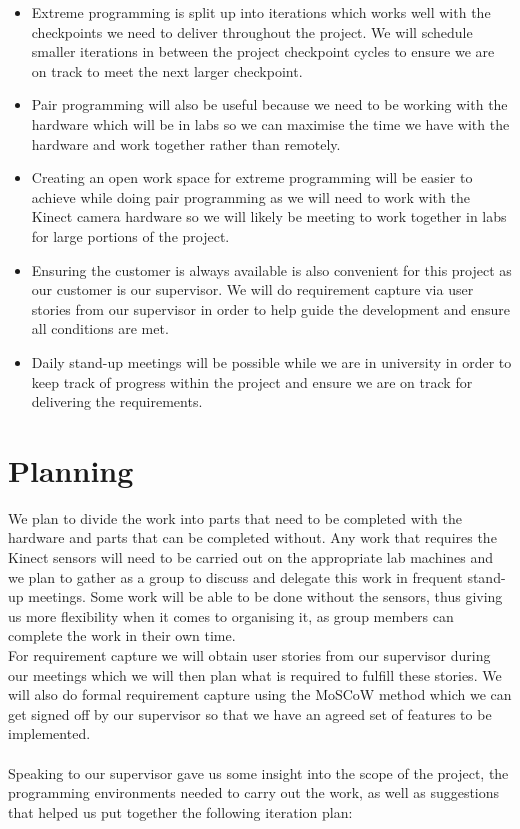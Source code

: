\documentclass[a4paper,12pt]{report}
\begin{document}
\begin{itemize}
\item Extreme programming is split up into iterations which works well with the checkpoints we need to deliver throughout the project. We will schedule smaller iterations in between the project checkpoint cycles to ensure we are on track to meet the next larger checkpoint.
\item Pair programming will also be useful because we need to be working with the hardware which will be in labs so we can maximise the time we have with the hardware and work together rather than remotely.
\item Creating an open work space for extreme programming will be easier to achieve while doing pair programming as we will need to work with the Kinect camera hardware so we will likely be meeting to work together in labs for large portions of the project.
\item Ensuring the customer is always available is also convenient for this project as our customer is our supervisor. We will do requirement capture via user stories from our supervisor in order to help guide the development and ensure all conditions are met.
\item Daily stand-up meetings will be possible while we are in university in order to keep track of progress within the project and ensure we are on track for delivering the requirements.
\end{itemize}

\section*{Planning}
We plan to divide the work into parts that need to be completed with the hardware and parts that can be completed without. Any work that requires the Kinect sensors will need to be carried out on the appropriate lab machines and we plan to gather as a group to discuss and delegate this work in frequent stand-up meetings. Some work will be able to be done without the sensors, thus giving us more flexibility when it comes to organising it, as group members can complete the work in their own time. \\

\noindent For requirement capture we will obtain user stories from our supervisor during our meetings which we will then plan what is required to fulfill these stories. We will also do formal requirement capture using the MoSCoW method which we can get signed off by our supervisor so that we have an agreed set of features to be implemented. \\
\\
Speaking to our supervisor gave us some insight into the scope of the project, the programming environments needed to carry out the work, as well as suggestions that helped us put together the following iteration plan:
\end{document}
